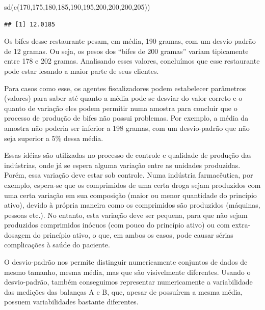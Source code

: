 \documentclass[
]{book}
\newenvironment{Shaded}{\begin{snugshade}}{\end{snugshade}}
\newcommand{\DecValTok}[1]{\textcolor[rgb]{0.00,0.00,0.81}{#1}}
\newcommand{\FunctionTok}[1]{\textcolor[rgb]{0.00,0.00,0.00}{#1}}
\newcommand{\NormalTok}[1]{#1}
\begin{document}
\begin{Shaded}
\begin{Highlighting}[]
\FunctionTok{sd}\NormalTok{(}\FunctionTok{c}\NormalTok{(}\DecValTok{170}\NormalTok{,}\DecValTok{175}\NormalTok{,}\DecValTok{180}\NormalTok{,}\DecValTok{185}\NormalTok{,}\DecValTok{190}\NormalTok{,}\DecValTok{195}\NormalTok{,}\DecValTok{200}\NormalTok{,}\DecValTok{200}\NormalTok{,}\DecValTok{200}\NormalTok{,}\DecValTok{205}\NormalTok{))}
\end{Highlighting}
\end{Shaded}

\begin{verbatim}
## [1] 12.0185
\end{verbatim}

Os bifes desse restaurante pesam, em média, 190 gramas, com um desvio-padrão de 12 gramas. Ou seja, os pesos dos ``bifes de 200 gramas'' variam tipicamente entre 178 e 202 gramas. Analisando esses valores, concluímos que esse restaurante pode estar lesando a maior parte de seus clientes.

Para casos como esse, os agentes fiscalizadores podem estabelecer parâmetros (valores) para saber até quanto a média pode se desviar do valor correto e o quanto de variação eles podem permitir numa amostra para concluir que o processo de produção de bifes não possui problemas. Por exemplo, a média da amostra não poderia ser inferior a 198 gramas, com um desvio-padrão que não seja superior a 5\% dessa média.

Essas idéias são utilizadas no processo de controle e qualidade de produção das indústrias, onde já se espera alguma variação entre as unidades produzidas. Porém, essa variação deve estar sob controle. Numa indústria farmacêutica, por exemplo, espera-se que os comprimidos de uma certa droga sejam produzidos com uma certa variação em sua composição (maior ou menor quantidade do princípio ativo), devido à própria maneira como os comprimidos são produzidos (máquinas, pessoas etc.). No entanto, esta variação deve ser pequena, para que não sejam produzidos comprimidos inócuos (com pouco do princípio ativo) ou com extra-dosagem do princípio ativo, o que, em ambos os casos, pode causar sérias complicações à saúde do paciente.

O desvio-padrão nos permite distinguir numericamente conjuntos de dados de mesmo tamanho, mesma média, mas que são visivelmente diferentes. Usando o desvio-padrão, também conseguimos representar numericamente a variabilidade das medições das balanças A e B, que, apesar de possuírem a mesma média, possuem variabilidades bastante diferentes.
\end{document}
